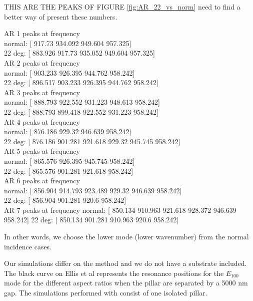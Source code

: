 THIS ARE THE PEAKS OF FIGURE \ref{fig:AR_22_vs_norm} need to find a better way of 
present these numbers. 

AR 1 peaks at frequency\\
normal: [ {\color{green}917.73} 934.092 949.604 957.325]\\
22 deg: [ {\color{red}883.926} {\color{green}917.73} 935.052 949.604 957.325]\\

AR 2 peaks at frequency\\
normal: [ {\color{green}903.233} 926.395 944.762 958.242]\\
22 deg: [ {\color{red}896.517} {\color{green}903.233} 926.395 944.762 958.242]\\

AR 3 peaks at frequency\\
normal: [ {\color{green}888.793} 922.552 931.223 948.613 958.242]\\
22 deg: [ {\color{green}888.793} 899.418 922.552 931.223 958.242]\\

AR 4 peaks at frequency\\
normal: [ {\color{green}876.186} 929.32 946.639 958.242]\\
22 deg: [ {\color{green}876.186} 901.281 921.618 929.32 945.745 958.242]\\

AR 5 peaks at frequency\\
normal: [ {\color{green}865.576} 926.395 945.745 958.242]\\
22 deg: [ {\color{green}865.576} 901.281 921.618 958.242]\\

AR 6 peaks at frequency\\
normal: [ {\color{green}856.904} 914.793 923.489 929.32 946.639 958.242]\\
22 deg: [ {\color{green}856.904} 901.281 920.6 958.242]\\

AR 7 peaks at frequency
normal: [ {\color{green}850.134} 910.963 921.618 928.372 946.639 958.242]
22 deg: [ {\color{green}850.134} 901.281 910.963 920.6 958.242]

In other words, we choose the lower mode (lower wavenumber) from the normal 
incidence cases.

Our simulations differ on the method and we do not have a substrate included. The black curve on 
Ellis et al \cite{ellis2016} represents the resonance positions for the $E_{100}$ mode for the different 
aspect ratios when the pillar are separated by a 5000 nm gap. The simulations performed with \pygbe 
consist of one isolated pillar.


